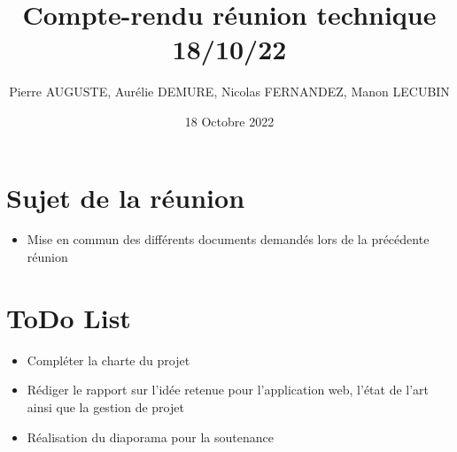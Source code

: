 \documentclass{article}
\title{Compte-rendu réunion technique 18/10/22}
\author{Pierre AUGUSTE, Aurélie DEMURE, Nicolas FERNANDEZ, Manon LECUBIN}
\date{18 Octobre 2022}
\begin{document}
\maketitle

\section{Sujet de la réunion}

\begin{itemize}
    \item Mise en commun des différents documents demandés lors de la précédente réunion
\end{itemize}

\section{ToDo List}
\begin{itemize}
    \item Compléter la charte du projet 
    \item Rédiger le rapport sur l'idée retenue pour l'application web, l'état de l'art ainsi que la gestion de projet
    \item Réalisation du diaporama pour la soutenance
\end{itemize}
\end{document}
